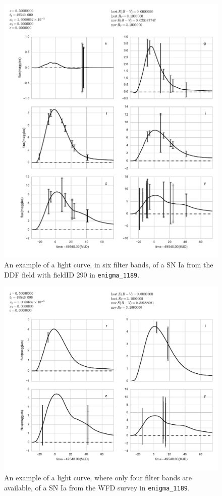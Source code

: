 \begin{figure}
\centering
\includegraphics[angle=0,width=14truecm]{figs/supernova/SN_290_lc.pdf}
\caption{An example of a light curve, in six filter bands, of a SN Ia from the DDF field with fieldID 290 in
\texttt{enigma\_1189}.
}
\label{fig:SNIaLCopsimdeep}
\end{figure}

\begin{figure}
\centering
\includegraphics[angle=0,width=0.99\hsize:,clip]{figs/supernova/SN_309_lc.pdf}
\caption{An example of a light curve, where only four filter bands are available, of a SN Ia from
the WFD survey in
\texttt{enigma\_1189}.
}
\label{fig:SNIaLCopsimmain}
\end{figure}

